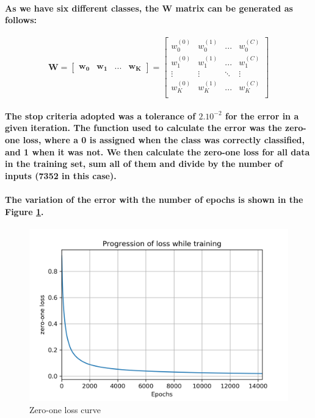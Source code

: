 \documentclass[a4paper]{article}    %
\begin{document}
\paragraph{As we have six different classes, the W matrix can be generated as follows:}

\[ \boldsymbol{W} = \begin{bmatrix} \boldsymbol{w_0} & \boldsymbol{w_1} & ... & \boldsymbol{w_K} \end{bmatrix} = \begin{bmatrix} 
    w_0^{(0)} & w_0^{(1)} &   ...  & w_0^{(C)} \\ 
    w_1^{(0)} & w_1^{(1)} &   ...  & w_1^{(C)} \\
      \vdots  &   \vdots  & \ddots &   \vdots  \\
    w_K^{(0)} & w_K^{(1)} &   ...  & w_K^{(C)} \\
\end{bmatrix} \]

\paragraph{The stop criteria adopted was a tolerance of $2.10^{-2}$ for the error in a given iteration. The function used to calculate the error was the zero-one loss, where a 0 is assigned when the class was correctly classified, and 1 when it was not. We then calculate the zero-one loss for all data in the training set, sum all of them and divide by the number of inputs (7352 in this case).}

\paragraph{The variation of the error with the number of epochs is shown in the Figure \ref{fig:ex2-a-zero_one_loss}.}

\begin{figure}[H]
    \centering
    \includegraphics[width=12cm]{zero_one_loss}
    \caption{Zero-one loss curve}
    \label{fig:ex2-a-zero_one_loss}
\end{figure}
\end{document}
